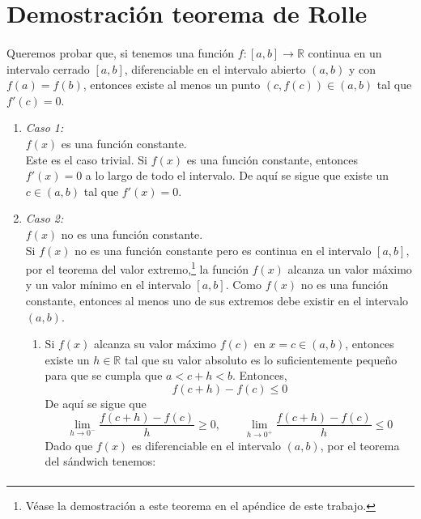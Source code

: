 \documentclass[letter]{article}
\begin{document}
\section{Demostración teorema de Rolle}
\paragraph{}Queremos probar que, si tenemos una función $f:[a,b]\longrightarrow\mathbb{R}$ continua en un intervalo cerrado $[a,b]$, diferenciable en el intervalo abierto $(a,b)$ y con $f(a)=f(b)$, entonces existe al menos un punto $(c,f(c))\in(a,b)$ tal que $f'(c)=0$.
\begin{enumerate}
    \item \textit{Caso 1:} %
    \vspace{2mm}\\
    $f(x)$ es una función constante. \vspace{2mm}\\
    Este es el caso trivial. Si $f(x)$ es una función constante, entonces $f'(x)=0$ a lo largo de todo el intervalo. De aquí se sigue que existe un $c\in(a,b)$ tal que $f'(x)=0$.
    \newpage
    \item \textit{Caso 2: }
    \vspace{2mm}
    \\
    $f(x)$ no es una función constante.
    \vspace{2mm}\\
    Si $f(x)$ no es una función constante pero es continua en el intervalo $[a,b]$, por el teorema del valor extremo,\footnote{Véase la demostración a este teorema en el apéndice de este trabajo.} la función $f(x)$ alcanza un valor máximo y un valor mínimo en el intervalo $[a,b]$. Como $f(x)$ no es una función constante, entonces al menos uno de sus extremos debe existir en el intervalo $(a,b)$.
    \begin{enumerate}
        \item %
        Si $f(x)$ alcanza su valor máximo $f(c)$ en $x=c\in(a,b)$, entonces existe un $h\in\mathbb{R}$ tal que su valor absoluto es lo suficientemente pequeño para que se cumpla que $a<c+h<b$. Entonces,
        $$f(c+h)-f(c)\le0$$
        De aquí se sigue que
        $$\lim_{h\rightarrow0^{-}}\frac{f(c+h)-f(c)}{h}\ge0,\qquad\lim_{h\rightarrow0^{+}}\frac{f(c+h)-f(c)}{h}\le0$$
        Dado que $f(x)$ es diferenciable en el intervalo $(a,b)$, por el teorema del sándwich tenemos:
        \begin{equation*}
            \begin{split}

\end{split}
\end{equation*}
\end{enumerate}
\end{enumerate}
\end{document}
